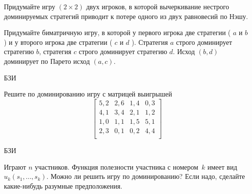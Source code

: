 \begin{problem}

Придумайте игру  $\left(2\times 2\right)$  двух игроков, в которой вычеркивание нестрого доминируемых стратегий приводит к потере одного из двух равновесий по Нэшу.



\begin{sol}

\end{sol}
\end{problem}


\begin{problem}

Придумайте биматричную игру, в которой у первого игрока две стратегии ( $a$  и  $b$ ) и у второго игрока две стратегии ( $c$  и  $d$ ). Стратегия  $a$  строго доминирует стратегию  $b$, стратегия  $c$  строго доминирует стратегию  $d$. Исход  $\left(b,d\right)$  доминирует по Парето исход  $\left(a,c\right)$.



\begin{sol}

\end{sol}
\end{problem}


\begin{problem}
\begin{source}
БЗИ
\end{source}
Решите по доминированию игру с матрицей
выигрышей
\[\left[\begin{array}{cccc} 5,2&2,6&1,4&0,3\\ 4,1&3,4&2,1&1,2\\
1,0&1,1&1,5&5,1\\ 2,3&0,1&0,2&4,4\\
\end{array}\right]\]
\begin{sol}
\end{sol}
\end{problem}




\begin{problem} 
\begin{source}
БЗИ
\end{source}
Играют $n$ участников.
Функция полезности участника с номером~$k$ имеет вид
$u_k(s_1,\ldots,s_k)$. Можно ли решить игру по
доминированию? Если надо, сделайте какие-нибудь разумные
предположения.
\begin{sol}
\end{sol}
\end{problem}


